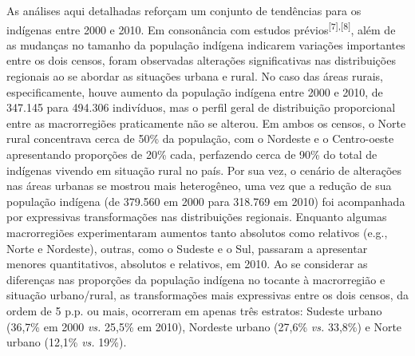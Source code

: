 \documentclass{article}
\begin{document}
As análises aqui detalhadas reforçam um conjunto de tendências para os indígenas
entre 2000 e 2010. Em consonância com estudos prévios\textsuperscript{[}\textsuperscript{7}\textsuperscript{]}\textsuperscript{,}\textsuperscript{[}\textsuperscript{8}\textsuperscript{]}, além de as mudanças no tamanho da população indígena indicarem variações
importantes entre os dois censos, foram observadas alterações significativas nas
distribuições regionais ao se abordar as situações urbana e rural. No caso das
áreas rurais, especificamente, houve aumento da população indígena entre 2000 e
2010, de 347.145 para 494.306 indivíduos, mas o perfil geral de distribuição
proporcional entre as macrorregiões praticamente não se alterou. Em ambos os
censos, o Norte rural concentrava cerca de 50\% da população, com o Nordeste e o
Centro-oeste apresentando proporções de 20\% cada, perfazendo cerca de 90\% do
total de indígenas vivendo em situação rural no país. Por sua vez, o cenário de
alterações nas áreas urbanas se mostrou mais heterogêneo, uma vez que a redução
de sua população indígena (de 379.560 em 2000 para 318.769 em 2010) foi
acompanhada por expressivas transformações nas distribuições regionais. Enquanto
algumas macrorregiões experimentaram aumentos tanto absolutos como relativos
(e.g., Norte e Nordeste), outras, como o Sudeste e o Sul, passaram a apresentar
menores quantitativos, absolutos e relativos, em 2010. Ao se considerar as
diferenças nas proporções da população indígena no tocante à macrorregião e
situação urbano/rural, as transformações mais expressivas entre os dois censos,
da ordem de 5 p.p. ou mais, ocorreram em apenas três estratos: Sudeste urbano
(36,7\% em 2000 \textit{vs.}
25,5\% em 2010), Nordeste urbano (27,6\% \textit{vs.}
33,8\%) e Norte urbano (12,1\% \textit{vs.}
19\%).
\end{document}
